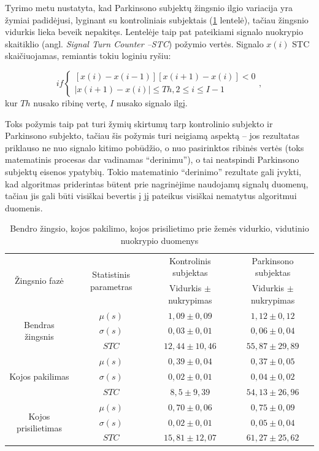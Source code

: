 \documentclass[]{vgtuef}
\begin{document}
Tyrimo metu nustatyta, kad Parkinsono subjektų žingsnio ilgio variacija yra žymiai padidėjusi, lyginant su kontroliniais subjektais (\ref{table:gait_corr_params} lentelė), tačiau žingsnio vidurkis lieka beveik nepakitęs. Lentelėje taip pat pateikiami signalo nuokrypio skaitiklio (angl. \textit{Signal Turn Counter --STC}) požymio vertės. Signalo $x(i)$ STC skaičiuojamas, remiantis tokiu loginiu ryšiu:

\begin{equation}
 if \left\{ \begin{array}{l}
 	[x(i)-x(i-1)][x(i+1)-x(i)] < 0 \\
 	|x(i+1)-x(i)| \leq Th, 2 \leq i \leq I-1
 \end{array} \right. ,
\end{equation}
kur $Th$ nusako ribinę vertę, $I$ nusako signalo ilgį.

Toks požymis taip pat turi žymių skirtumų tarp kontrolinio subjekto ir Parkinsono subjekto, tačiau šis požymis turi neigiamą aspektą -- jos rezultatas priklauso ne nuo signalo kitimo pobūdžio, o nuo pasirinktos ribinės vertės (toks matematinis procesas dar vadinamas ``derinimu''), o tai neatspindi Parkinsono subjektų eisenos ypatybių. Tokio matematinio ``derinimo'' rezultate gali įvykti, kad algoritmas priderintas būtent prie nagrinėjime naudojamų signalų duomenų, tačiau jis gali būti visiškai bevertis į jį pateikus visiškai nematytus algoritmui duomenis.

\begin{table}
  \centering
  \renewcommand{\arraystretch}{1.3}
  \caption{Bendro žingsio, kojos pakilimo, kojos prisilietimo prie žemės vidurkio, vidutinio nuokrypio duomenys \cite{5280353}}
  \label{table:gait_corr_params}
	\begin{tabular}{|c|c|c|c|} \hline
		 \multirow{2}{*}{Žingsnio fazė} & 
		 \multirow{2}{*}{Statistinis parametras} & Kontrolinis subjektas & Parkinsono subjektas \\ 	\cline{3-4}
		 & & Vidurkis $\pm$ nukrypimas & Vidurkis $\pm$ nukrypimas \\ \hline
		 \multirow{3}{*}{Bendras žingsnis} 
		 	& $\mu(s)$    & $1,09 \pm 0,09$   & $1,12 \pm 0,12$ \\ \cline{2-4}
		 	& $\sigma(s)$ & $0,03 \pm 0,01$   & $0,06 \pm 0,04$ \\ \cline{2-4} 
		 	& $STC$       & $12,44 \pm 10,46$ & $55,87 \pm 29,89$ \\ \hline
		 \multirow{3}{*}{Kojos pakilimas}
	 	 	& $\mu(s)$    & $0,39 \pm 0,04$   & $0,37 \pm 0,05$ \\ \cline{2-4}
		 	& $\sigma(s)$ & $0,02 \pm 0,01$   & $0,04 \pm 0,02$ \\ \cline{2-4} 
		 	& $STC$       & $8,5 \pm 9,39$    & $54,13 \pm 26,96$ \\ \hline
		 \multirow{3}{*}{Kojos prisilietimas}
		 	& $\mu(s)$    & $0,70 \pm 0,06$   & $0,75 \pm 0,09$ \\ \cline{2-4}
		 	& $\sigma(s)$ & $0,02 \pm 0,01$   & $0,05 \pm 0,04$ \\ \cline{2-4} 
		 	& $STC$       & $15,81 \pm 12,07$ & $61,27 \pm 25,62$ \\ \hline
	\end{tabular}
\end{table}
\end{document}
